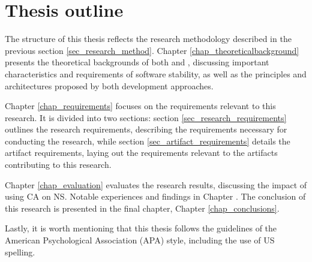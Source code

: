 \section{Thesis outline} \label{sec_structure}

The structure of this thesis reflects the research methodology described in the previous
section \ref{sec_research_method}. Chapter \ref{chap_theoreticalbackground} presents the
theoretical backgrounds of both \ns and \ca, discussing important
characteristics and requirements of software stability, as well as the principles and
architectures proposed by both development approaches.

Chapter \ref{chap_requirements} focuses on the requirements relevant to this research. It
is divided into two sections: section \ref{sec_research_requirements} outlines the
research requirements, describing the requirements necessary for conducting the research,
while section \ref{sec_artifact_requirements} details the artifact requirements, laying
out the requirements relevant to the artifacts contributing to this research.

Chapter \ref{chap_evaluation} evaluates the research results, discussing the impact of
using CA on NS. Notable experiences and findings in Chapter . The
conclusion of this research is presented in the final chapter, Chapter \ref{chap_conclusions}.

Lastly, it is worth mentioning that this thesis follows the guidelines of the American
Psychological Association (APA) style, including the use of US spelling.